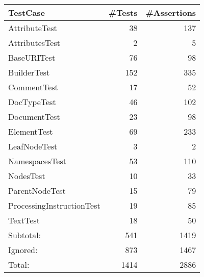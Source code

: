 \begin{tabular}{|l|r|r|}\hline
TestCase & \#Tests & \#Assertions\\\hline\hline
AttributeTest & 38 & 137\\\hline
AttributesTest & 2 & 5\\\hline
BaseURITest & 76 & 98\\\hline
BuilderTest & 152 & 335\\\hline
CommentTest & 17 & 52\\\hline
DocTypeTest & 46 & 102\\\hline
DocumentTest & 23 & 98\\\hline
ElementTest & 69 & 233\\\hline
LeafNodeTest & 3 & 2\\\hline
NamespacesTest & 53 & 110\\\hline
NodesTest & 10 & 33\\\hline
ParentNodeTest & 15 & 79\\\hline
ProcessingInstructionTest & 19 & 85\\\hline
TextTest & 18 & 50\\\hline
\hline
Subtotal: & 541 & 1419\\\hline
Ignored: & 873 & 1467\\\hline
Total: & 1414 & 2886\\\hline
\end{tabular}

